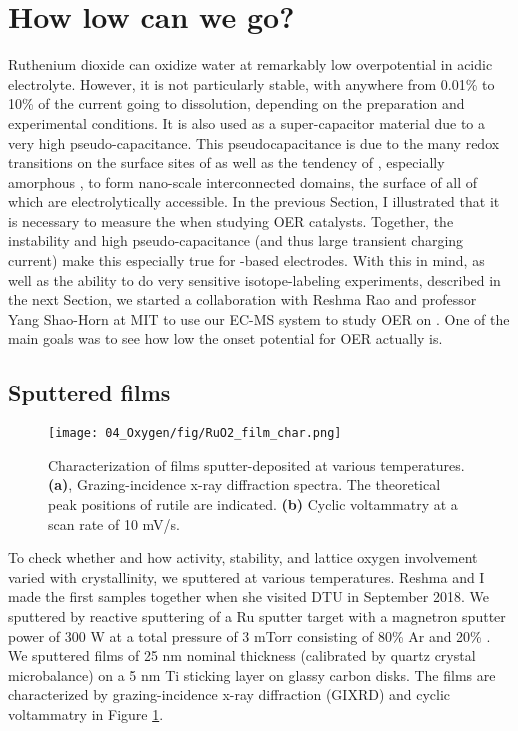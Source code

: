 
\section{How low can we go?}\label{sec:low_O2}

Ruthenium dioxide can oxidize water at remarkably low overpotential in acidic electrolyte\cite{Miles1976, Reier2017}. However, it is not particularly stable, with anywhere from 0.01\% to 10\% of the current going to  dissolution, depending on the preparation and experimental conditions\cite{Roy2018}. It is also used as a super-capacitor material\cite{Gonzalez2016} due to a very high pseudo-capacitance. This pseudocapacitance is due to the many redox transitions on the surface sites of  as well as the tendency of , especially amorphous , to form nano-scale interconnected domains, the surface of all of which are electrolytically accessible\cite{Yoshida2013}. In the previous Section, I illustrated that it is necessary to measure the  when studying OER catalysts. Together, the instability and high pseudo-capacitance (and thus large transient charging current) make this especially true for -based electrodes. With this in mind, as well as the ability to do very sensitive isotope-labeling experiments, described in the next Section, we started a collaboration with Reshma Rao and professor Yang Shao-Horn at MIT to use our EC-MS system to study OER on . One of the main goals was to see how low the onset potential for OER actually is.

\subsection{Sputtered  films}

\begin{figure}[h!]
	\centering
	\texttt{[image: 04\_Oxygen/fig/RuO2\_film\_char.png]}
	\caption{Characterization of  films sputter-deposited at various temperatures. \textbf{(a)}, Grazing-incidence x-ray diffraction spectra. The theoretical peak positions of rutile  are indicated. \textbf{(b)} Cyclic voltammatry at a scan rate of 10 mV/s.}
	\label{fig:RuO2_char}
\end{figure}

To check whether and how activity, stability, and lattice oxygen involvement varied with crystallinity, we sputtered  at various temperatures. Reshma and I made the first samples together when she visited DTU in September 2018. We sputtered  by reactive sputtering of a Ru sputter target with a magnetron sputter power of 300 W at a total pressure of 3 mTorr consisting of 80\% Ar and 20\% . We sputtered  films of 25 nm nominal thickness (calibrated by quartz crystal microbalance) on a 5 nm Ti sticking layer on glassy carbon disks. The films are characterized by grazing-incidence x-ray diffraction (GIXRD) and cyclic voltammatry in Figure \ref{fig:RuO2_char}.

